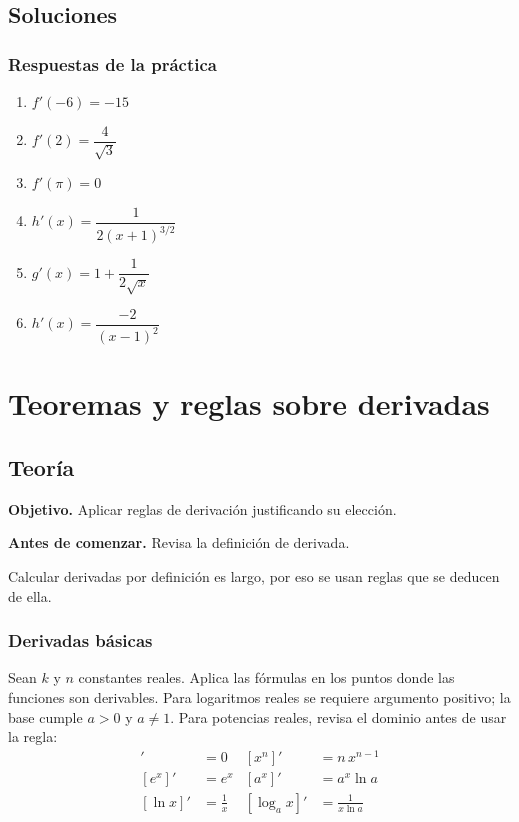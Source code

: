 \documentclass[12pt]{article}
\begin{document}
\subsection{Soluciones}

\subsubsection{Respuestas de la práctica}


\begin{enumerate}
    \item $f'(-6) = -15$
    \item $f'(2) = \dfrac{4}{\sqrt{3}}$
    \item $f'(\pi) = 0$
    \item $h'(x) = \dfrac{1}{2(x + 1)^{3/2}}$
    \item $g'(x) = 1 + \dfrac{1}{2\sqrt{x}}$
    \item $h'(x) = \dfrac{-2}{(x - 1)^2}$
\end{enumerate}



\section{Teoremas y reglas sobre derivadas}

\subsection{Teoría}

\textbf{Objetivo.} Aplicar reglas de derivación justificando su elección.

\textbf{Antes de comenzar.} Revisa la definición de derivada.


Calcular derivadas por definición es largo, por eso se usan reglas que se deducen de ella.



\subsubsection{Derivadas básicas}


Sean $k$ y $n$ constantes reales. Aplica las fórmulas en los puntos donde las funciones son derivables. Para logaritmos reales se requiere argumento positivo; la base cumple $a>0$ y $a\neq1$. Para potencias reales, revisa el dominio antes de usar la regla:
\begin{align*}
[k]' &= 0 & [x^n]' &= n\,x^{n-1} \\
[e^x]' &= e^x & [a^x]' &= a^x \ln a \\
[\ln x]' &= \frac{1}{x} & [\log_a x]' &= \frac{1}{x \ln a}
\end{align*}
\end{document}
